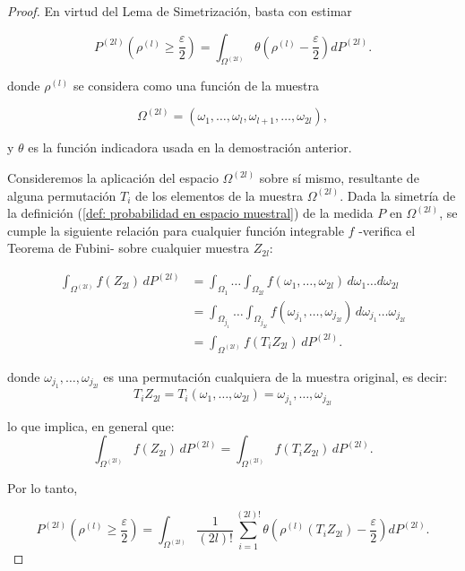 \documentclass{report}
\begin{document}
\begin{proof}
 
En virtud del Lema de Simetrización, basta con estimar  
    
\[
P^{(2l)}\left( \rho^{(l)} \geq \frac{\varepsilon}{2} \right) = \int_{\Omega^{(2l)}} \theta \left( \rho^{(l)} - \frac{\varepsilon}{2} \right) dP^{(2l)}.
\]

donde \( \rho^{(l)} \) se considera como una función de la muestra  

\[
\Omega^{(2l)} = (\omega_1, \dots, \omega_l, \omega_{l+1}, \dots, \omega_{2l}),
\]

y $\theta$ es la función indicadora usada en la demostración anterior.\newline

Consideremos la aplicación del espacio \( \Omega^{(2l)} \) sobre sí mismo, resultante de alguna permutación \( T_i \) de los elementos de la muestra \( \Omega^{(2l)} \). Dada la simetría 
de la definición (\ref{def: probabilidad en espacio muestral}) de la medida \( P \) en \( \Omega^{(2l)} \), se cumple la siguiente relación para cualquier función integrable \( f \)
-verifica el Teorema de Fubini- sobre cualquier muestra $Z_{2l}$:

\begin{equation*}
    \begin{split}
            \int_{\Omega^{(2l)}} f(Z_{2l}) \, dP^{(2l)} &= \int_{\Omega_1} \ldots \int_{\Omega_{2l}} f(\omega_1,\ldots,\omega_{2l})  \, d\omega_1\ldots d\omega_{2l} \\
                &= \int_{\Omega_{j_1}}\ldots\int_{\Omega_{j_{2l}}} f(\omega_{j_1},\ldots,\omega_{j_{2l}}) \, d\omega_{j_1}\ldots \omega_{j_{2l}}\\
                &= \int_{\Omega^{(2l)}} f(T_i Z_{2l}) \, dP^{(2l)}.
    \end{split}
\end{equation*}

donde $\omega_{j_1},\ldots,\omega_{j_{2l}}$ es una permutación cualquiera de la muestra original, es decir:
\[
T_i Z_{2l} = T_i (\omega_1,\ldots,\omega_{2l}) = \omega_{j_1},\ldots,\omega_{j_{2l}}
\]

lo que implica, en general que:
\[
\int_{\Omega^{(2l)}} f(Z_{2l}) \, dP^{(2l)} = \int_{\Omega^{(2l)}} f(T_i Z_{2l}) \, dP^{(2l)}.
\]

Por lo tanto,

\begin{equation}\label{eq:probabilidad integral con permutaciones}
P^{(2l)}\left( \rho^{(l)} \geq \frac{\varepsilon}{2} \right) = \int_{\Omega^{(2l)}} \frac{1}{(2l)!} \sum_{i=1}^{(2l)!} \theta \left( \rho^{(l)}(T_i Z_{2l}) - \frac{\varepsilon}{2}  \right) dP^{(2l)}.
\end{equation}


\end{proof}
\end{document}
